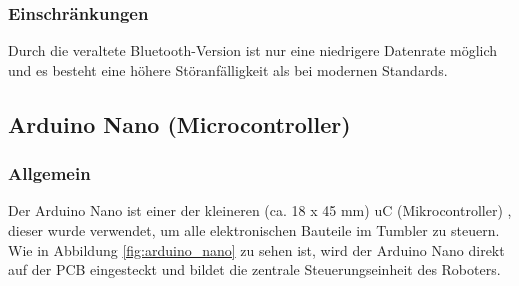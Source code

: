 \subsubsection{Einschränkungen}
Durch die veraltete Bluetooth-Version ist nur eine niedrigere Datenrate möglich
und es besteht eine höhere Störanfälligkeit als bei modernen Standards.
%
\subsection{Arduino Nano (Microcontroller)}
%
\subsubsection{Allgemein}
Der Arduino Nano ist einer der kleineren (ca. 18 x 45 mm) uC (Mikrocontroller) \cite{arduino-nano},
dieser wurde verwendet, um alle elektronischen Bauteile im Tumbler zu steuern.
%
Wie in Abbildung \ref{fig:arduino_nano} zu sehen ist,
wird der Arduino Nano direkt auf der PCB eingesteckt und bildet die zentrale Steuerungseinheit des Roboters.
